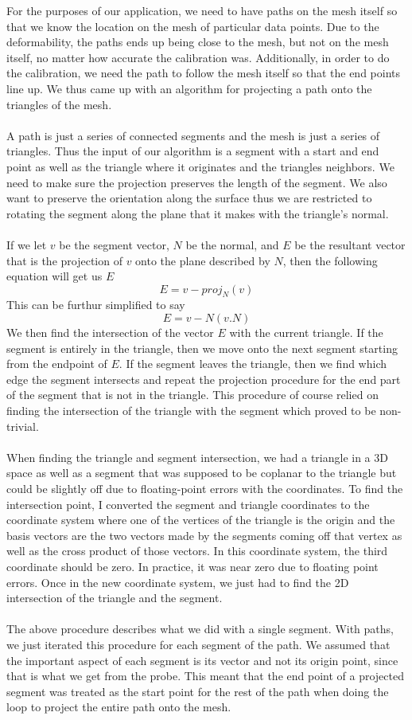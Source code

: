 \documentclass[conference]{acmsiggraph}
\begin{document}
For the purposes of our application, we need to have paths on the mesh itself so that we know the location on the mesh of particular data points. Due to the deformability, the paths ends up being close to the mesh, but not on the mesh itself, no matter how accurate the calibration was. Additionally, in order to do the calibration, we need the path to follow the mesh itself so that the end points line up. We thus came up with an algorithm for projecting a path onto the triangles of the mesh. \\
\\
A path is just a series of connected segments and the mesh is just a series of triangles. Thus the input of our algorithm is a segment with a start and end point as well as the triangle where it originates and the triangles neighbors. We need to make sure the projection preserves the length of the segment. We also want to preserve the orientation along the surface thus we are restricted to rotating the segment along the plane that it makes with the triangle's normal. \\
\\
If we let $v$ be the segment vector, $N$ be the normal, and $E$ be the resultant vector that is the projection of $v$ onto the plane described by $N$, then the following equation will get us $E$
\[
E = v - proj_N(v)
\]
This can be furthur simplified to say
\[
E = v - N(v.N)
\]
We then find the intersection of the vector $E$ with the current triangle. If the segment is entirely in the triangle, then we move onto the next segment starting from the endpoint of $E$. If the segment leaves the triangle, then we find which edge the segment intersects and repeat the projection procedure for the end part of the segment that is not in the triangle. This procedure of course relied on finding the intersection of the triangle with the segment which proved to be non-trivial.\\
\\
When finding the triangle and segment intersection, we had a triangle in a 3D space as well as a segment that was supposed to be coplanar to the triangle but could be slightly off due to floating-point errors with the coordinates. To find the intersection point, I converted the segment and triangle coordinates to the coordinate system where one of the vertices of the triangle is the origin and the basis vectors are the two vectors made by the segments coming off that vertex as well as the cross product of those vectors. In this coordinate system, the third coordinate should be zero. In practice, it was near zero due to floating point errors. Once in the new coordinate system, we just had to find the 2D intersection of the triangle and the segment. \\
\\
The above procedure describes what we did with a single segment. With paths, we just iterated this procedure for each segment of the path. We assumed that the important aspect of each segment is its vector and not its origin point, since that is what we get from the probe. This meant that the end point of a projected segment was treated as the start point for the rest of the path when doing the loop to project the entire path onto the mesh.
\end{document}
